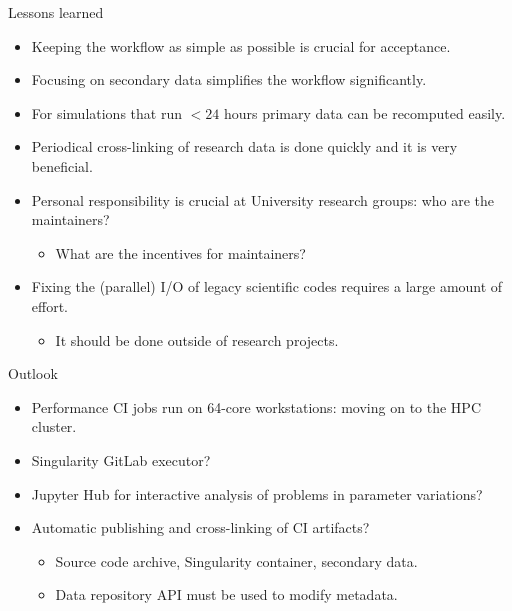 \documentclass[
	aspectratio=169,%
	color={accentcolor=2d},
	logo=true,%
	colorframetitle=true,%
	]{tudabeamer}
\begin{document}
\begin{frame}{Lessons learned}
	\vfill
        \begin{itemize}
            \item Keeping the workflow as simple as possible is crucial for acceptance.
            \item Focusing on secondary data simplifies the workflow significantly.  
            \item For simulations that run $<24$ hours primary data can be recomputed easily. 
            \item Periodical cross-linking of research data is done quickly and it is very beneficial. 
            \item Personal responsibility is crucial at University research groups: who are the maintainers? 
                \begin{itemize}
                    \item What are the incentives for maintainers? 
                \end{itemize}
            \item Fixing the (parallel) I/O of legacy scientific codes requires a large amount of effort. 
                \begin{itemize}
                    \item It should be done outside of research projects. 
                \end{itemize}
        \end{itemize}
\end{frame}

\begin{frame}{Outlook}
	\vfill
	\begin{itemize}
            \item Performance CI jobs run on 64-core workstations: moving on to the HPC cluster. 
            \item Singularity GitLab executor? 
            \item Jupyter Hub for interactive analysis of problems in parameter variations?
            \item Automatic publishing and cross-linking of CI artifacts? 
                \begin{itemize}
                    \item Source code archive, Singularity container, secondary data. 
                    \item Data repository API must be used to modify metadata. 
                \end{itemize}
	\end{itemize}
\end{frame}
\end{document}
